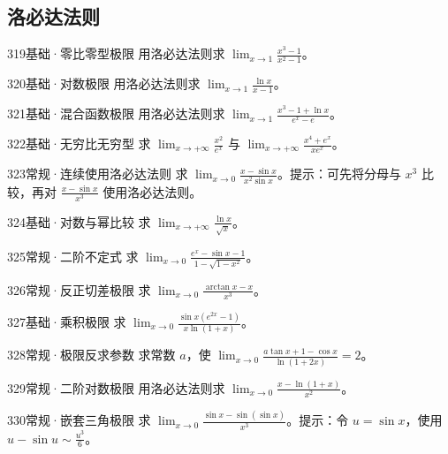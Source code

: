 \subsection{洛必达法则}
\begin{exercise}{319}{基础·零比零型极限}
用洛必达法则求 $\lim_{x\to1}\frac{x^3-1}{x^2-1}$。
\end{exercise}
\begin{exercise}{320}{基础·对数极限}
用洛必达法则求 $\lim_{x\to1}\frac{\ln x}{x-1}$。
\end{exercise}
\begin{exercise}{321}{基础·混合函数极限}
用洛必达法则求 $\lim_{x\to1}\frac{x^3-1+\ln x}{e^x-e}$。
\end{exercise}
\begin{exercise}{322}{基础·无穷比无穷型}
求 $\lim_{x\to+\infty}\frac{x^2}{e^x}$ 与 $\lim_{x\to+\infty}\frac{x^4+e^x}{xe^x}$。
\end{exercise}
\begin{exercise}{323}{常规·连续使用洛必达法则}
求 $\lim_{x\to0}\frac{x-\sin x}{x^2\sin x}$。提示：可先将分母与 $x^3$ 比较，再对 $\frac{x-\sin x}{x^3}$ 使用洛必达法则。
\end{exercise}
\begin{exercise}{324}{基础·对数与幂比较}
求 $\lim_{x\to+\infty}\frac{\ln x}{\sqrt x}$。
\end{exercise}
\begin{exercise}{325}{常规·二阶不定式}
求 $\lim_{x\to0}\frac{e^x-\sin x-1}{1-\sqrt{1-x^2}}$。
\end{exercise}
\begin{exercise}{326}{常规·反正切差极限}
求 $\lim_{x\to0}\frac{\arctan x-x}{x^3}$。
\end{exercise}
\begin{exercise}{327}{基础·乘积极限}
求 $\lim_{x\to0}\frac{\sin x(e^{2x}-1)}{x\ln(1+x)}$。
\end{exercise}
\begin{exercise}{328}{常规·极限反求参数}
求常数 $a$，使 $\lim_{x\to0}\frac{a\tan x+1-\cos x}{\ln(1+2x)}=2$。
\end{exercise}
\begin{exercise}{329}{常规·二阶对数极限}
用洛必达法则求 $\lim_{x\to0}\frac{x-\ln(1+x)}{x^2}$。
\end{exercise}
\begin{exercise}{330}{常规·嵌套三角极限}
求 $\lim_{x\to0}\frac{\sin x-\sin(\sin x)}{x^3}$。提示：令 $u=\sin x$，使用 $u-\sin u\sim\frac{u^3}{6}$。
\end{exercise}
